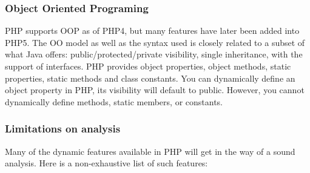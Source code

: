 \documentclass[a4paper]{article}
\begin{document}
\subsubsection{Object Oriented Programing}
PHP supports OOP as of PHP4, but many features have later been added into PHP5.
The OO model as well as the syntax used is closely related to a subset of what
Java offers: public/protected/private visibility, single inheritance, with the
support of interfaces. PHP provides object properties, object methods, static
properties, static methods and class constants. You can dynamically define an
object property in PHP, its visibility will default to public. However, you
cannot dynamically define methods, static members, or constants.

\subsubsection{Limitations on analysis}
Many of the dynamic features available in PHP will get in the way of a sound
analysis.  Here is a non-exhaustive list of such features:
\end{document}
